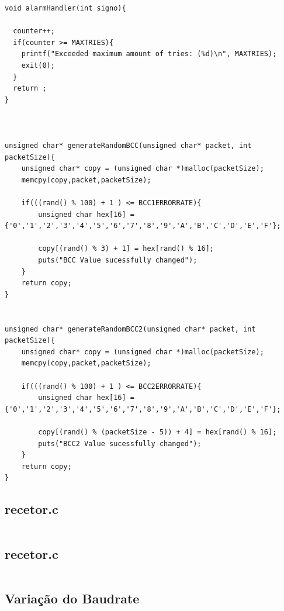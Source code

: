 \documentclass{article}
\begin{document}
\begin{lstlisting}[style=CStyle]
void alarmHandler(int signo){

  counter++;
  if(counter >= MAXTRIES){
    printf("Exceeded maximum amount of tries: (%d)\n", MAXTRIES);
    exit(0);
  }
  return ;
}



unsigned char* generateRandomBCC(unsigned char* packet, int packetSize){
    unsigned char* copy = (unsigned char *)malloc(packetSize);
    memcpy(copy,packet,packetSize);

    if(((rand() % 100) + 1 ) <= BCC1ERRORRATE){
        unsigned char hex[16] = {'0','1','2','3','4','5','6','7','8','9','A','B','C','D','E','F'};

        copy[(rand() % 3) + 1] = hex[rand() % 16];
        puts("BCC Value sucessfully changed");
    }
    return copy;
}


unsigned char* generateRandomBCC2(unsigned char* packet, int packetSize){
    unsigned char* copy = (unsigned char *)malloc(packetSize);
    memcpy(copy,packet,packetSize);

    if(((rand() % 100) + 1 ) <= BCC2ERRORRATE){
        unsigned char hex[16] = {'0','1','2','3','4','5','6','7','8','9','A','B','C','D','E','F'};
        
        copy[(rand() % (packetSize - 5)) + 4] = hex[rand() % 16];
        puts("BCC2 Value sucessfully changed");
    }
    return copy;
}
\end{lstlisting}

\subsection{recetor.c}

\begin{lstlisting}[style=CStyle]

\end{lstlisting}

\subsection{recetor.c}

\begin{lstlisting}[style=CStyle]

\end{lstlisting}

 
\subsection{Variação do Baudrate}
\end{document}
